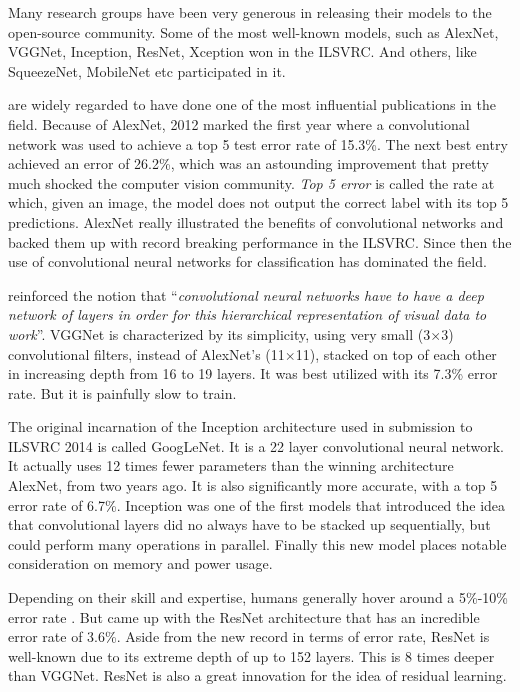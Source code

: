 \documentclass[12pt,a4paper]{report}
\newcommand{\defn}[1]{\enquote{\textit{#1}}}
\newcommand{\term}{\textit}
\newcommand{\acronym}{\MakeUppercase}
\begin{document}
	Many research groups have been very generous in releasing their 
	models to the open-source community. Some of the most well-known models, such as 
	AlexNet, VGGNet, Inception, ResNet, Xception \citep{Krizhevsky_alexnet, Simonyan_vgg, 
	Szegedy_inception, He_resnet, Chollet_xception} won in the \acronym{ilsvrc}. 
	And others, like SqueezeNet, MobileNet \citep{Iandola_squeezenet, Howard_mobilenet} 
	etc participated in it.
	\par
	\citet{Krizhevsky_alexnet} 
	are widely regarded to have done one of the most influential publications in the field. 
	Because of AlexNet, 2012 marked the first year where a convolutional network was used to 
	achieve a top 5 test error rate of 15.3\%. The next best entry achieved an error 
	of 26.2\%, which was an astounding improvement that pretty much shocked the computer 
	vision community. \term{Top 5 error} is called the rate at which, given an image, 
	the model does not output the correct label with its top 5 predictions. AlexNet 
	really illustrated the benefits of convolutional networks and backed them up with 
	record breaking performance in the \acronym{ilsvrc}. Since then the use of convolutional 
	neural networks for classification has dominated the field.
	\par
	\citet{Simonyan_vgg} reinforced the notion that \defn{convolutional neural networks 
	have to have a deep network of layers in order for this hierarchical representation 
	of visual data to work}. VGGNet is characterized by its simplicity, using very small 
	(3$\times$3) convolutional filters, instead of AlexNet’s (11$\times$11), stacked on 
	top of each other in increasing depth from 16 to 19 layers. It was best utilized with 
	its 7.3\% error rate. But it is painfully slow to train.
	\par
	The original incarnation of the Inception architecture used in \citet{Szegedy_inception} 
	submission to \acronym{ilsvrc} 2014 is called GoogLeNet. It is a 22 layer convolutional 
	neural network. It actually uses 12 times fewer parameters than the winning architecture 
	AlexNet, from two years ago. It is also significantly more accurate, with a top 
	5 error rate of 6.7\%. Inception was one of the first models that introduced the 
	idea that convolutional layers did no always have to be stacked up sequentially, 
	but could perform many operations in parallel. Finally this new model places notable 
	consideration on memory and power usage.
	\par
	Depending on their skill and expertise, humans generally hover around a 5\%-10\% 
	error rate \citep{Deshpande}. But \citet{He_resnet} came up with the ResNet 
	architecture that has an incredible error rate of 3.6\%. Aside from the new record 
	in terms of error rate, ResNet is well-known due to its extreme depth of up to 152 
	layers. This is 8 times deeper than VGGNet. ResNet is also a great innovation for 
	the idea of residual learning.
	\\
	
\end{document}
